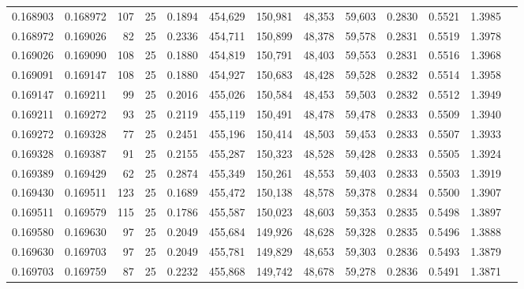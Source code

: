 \begin{tabular}{rrrrrrrrrrrrr}
0.168903 & 0.168972 &   107 &  25 &                                     0.1894 & 454,629 & 150,981 &  48,353 &  59,603 & 0.2830 & 0.5521 & 1.3985 \\
0.168972 & 0.169026 &    82 &  25 &                                     0.2336 & 454,711 & 150,899 &  48,378 &  59,578 & 0.2831 & 0.5519 & 1.3978 \\
0.169026 & 0.169090 &   108 &  25 &                                     0.1880 & 454,819 & 150,791 &  48,403 &  59,553 & 0.2831 & 0.5516 & 1.3968 \\
0.169091 & 0.169147 &   108 &  25 &                                     0.1880 & 454,927 & 150,683 &  48,428 &  59,528 & 0.2832 & 0.5514 & 1.3958 \\
0.169147 & 0.169211 &    99 &  25 &                                     0.2016 & 455,026 & 150,584 &  48,453 &  59,503 & 0.2832 & 0.5512 & 1.3949 \\
0.169211 & 0.169272 &    93 &  25 &                                     0.2119 & 455,119 & 150,491 &  48,478 &  59,478 & 0.2833 & 0.5509 & 1.3940 \\
0.169272 & 0.169328 &    77 &  25 &                                     0.2451 & 455,196 & 150,414 &  48,503 &  59,453 & 0.2833 & 0.5507 & 1.3933 \\
0.169328 & 0.169387 &    91 &  25 &                                     0.2155 & 455,287 & 150,323 &  48,528 &  59,428 & 0.2833 & 0.5505 & 1.3924 \\
0.169389 & 0.169429 &    62 &  25 &                                     0.2874 & 455,349 & 150,261 &  48,553 &  59,403 & 0.2833 & 0.5503 & 1.3919 \\
0.169430 & 0.169511 &   123 &  25 &                                     0.1689 & 455,472 & 150,138 &  48,578 &  59,378 & 0.2834 & 0.5500 & 1.3907 \\
0.169511 & 0.169579 &   115 &  25 &                                     0.1786 & 455,587 & 150,023 &  48,603 &  59,353 & 0.2835 & 0.5498 & 1.3897 \\
0.169580 & 0.169630 &    97 &  25 &                                     0.2049 & 455,684 & 149,926 &  48,628 &  59,328 & 0.2835 & 0.5496 & 1.3888 \\
0.169630 & 0.169703 &    97 &  25 &                                     0.2049 & 455,781 & 149,829 &  48,653 &  59,303 & 0.2836 & 0.5493 & 1.3879 \\
0.169703 & 0.169759 &    87 &  25 &                                     0.2232 & 455,868 & 149,742 &  48,678 &  59,278 & 0.2836 & 0.5491 & 1.3871 \\

\end{tabular}
